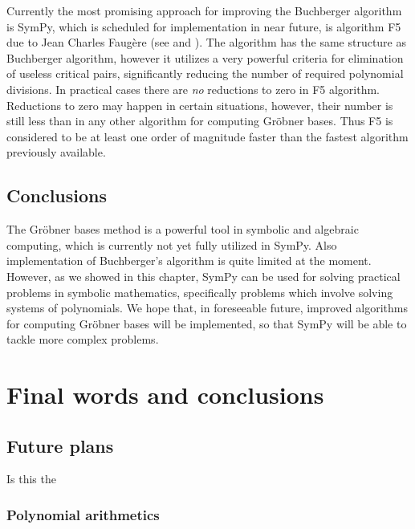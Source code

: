 Currently the most promising approach for improving the Buchberger algorithm is SymPy, which is scheduled
for implementation in near future, is algorithm F5 due to Jean Charles Faugère (see \cite{Faugere2002f5} and
\cite{Stegers2006f5}). The algorithm has the same structure as Buchberger algorithm, however it utilizes a very
powerful criteria for elimination of useless critical pairs, significantly reducing the number of required
polynomial divisions.  In practical cases there are \emph{no} reductions to zero in F5 algorithm. Reductions to
zero may happen in certain situations, however, their number is still less than in any other algorithm for
computing Gröbner bases. Thus F5 is considered to be at least one order of magnitude faster than the
fastest algorithm previously available.


\subsection{Conclusions}

The Gröbner bases method is a powerful tool in symbolic and algebraic computing, which is currently
not yet fully utilized in SymPy. Also implementation of Buchberger's algorithm is quite limited at
the moment. However, as we showed in this chapter, SymPy can be used for solving practical problems
in symbolic mathematics, specifically problems which involve solving systems of polynomials. We hope
that, in foreseeable future, improved algorithms for computing Gröbner bases will be implemented,
so that SymPy will be able to tackle more complex problems.

\hypertarget{--doc-src/conclusions}{}

\section{Final words and conclusions}\label{thesis-conclusions}


\subsection{Future plans}

Is this the


\subsubsection{Polynomial arithmetics}

\cite{Monagan2009parallel}
\cite{Monagan2007heaps}
\cite{Bernstein2008fast}


